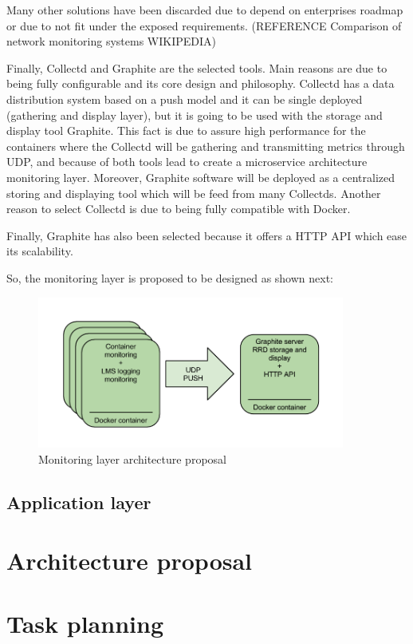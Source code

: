 Many other solutions have been discarded due to depend on enterprises roadmap or due to not fit under the exposed requirements. (REFERENCE Comparison of network monitoring systems WIKIPEDIA) 

Finally, Collectd and Graphite are the selected tools. Main reasons are due to being fully configurable and its core design and philosophy. Collectd has a data distribution system based on a push model and it can be single deployed (gathering and display layer), but it is going to be used with the storage and display tool Graphite. This fact is due to assure high performance for the containers where the Collectd will be gathering and transmitting metrics through UDP, and because of both tools lead to create a microservice architecture monitoring layer. Moreover, Graphite software will be deployed as a centralized storing and displaying tool which will be feed from many Collectds. Another reason to select Collectd is due to being fully compatible with Docker. 

Finally, Graphite has also been selected because it offers a HTTP API which ease its scalability. 

So, the monitoring layer is proposed to be designed as shown next:

\begin{figure}[htb]
\begin{center}
\includegraphics[width=0.9\textwidth]{./images/mlap.png}
\caption{Monitoring layer architecture proposal}
\label{F:MLAP}
\end{center}
\end{figure}

\subsection{Application layer}


\section{Architecture proposal}
\section{Task planning}



